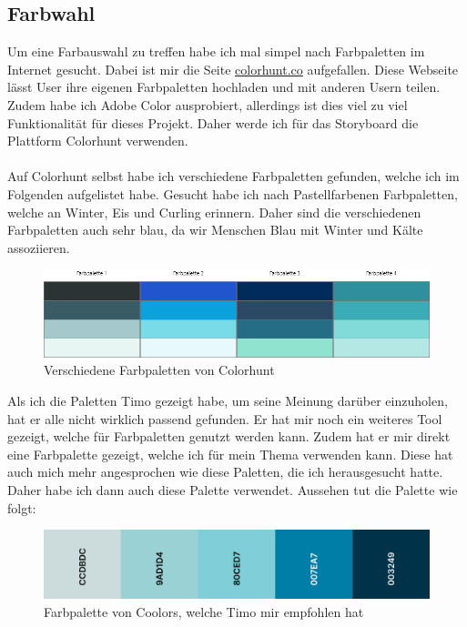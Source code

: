 \documentclass[11pt]{article}
\begin{document}
    \subsection{Farbwahl}
    Um eine Farbauswahl zu treffen habe ich mal simpel nach Farbpaletten im Internet gesucht. Dabei ist mir die Seite
    \url{colorhunt.co} aufgefallen. Diese Webseite lässt User ihre eigenen Farbpaletten hochladen und mit
    anderen Usern teilen. Zudem habe ich Adobe Color ausprobiert, allerdings ist dies viel zu viel
    Funktionalität für dieses Projekt. Daher werde ich für das Storyboard die Plattform Colorhunt verwenden.\\
    \\
    Auf Colorhunt selbst habe ich verschiedene Farbpaletten gefunden, welche ich im Folgenden aufgelistet
    habe. Gesucht habe ich nach Pastellfarbenen Farbpaletten, welche an Winter, Eis und Curling erinnern.
    Daher sind die verschiedenen Farbpaletten auch sehr blau, da wir Menschen Blau mit Winter und Kälte
    assoziieren.

    \begin{figure}[h]
        \includegraphics[width=\textwidth]{media/color_palettes}
        \caption{Verschiedene Farbpaletten von Colorhunt}
    \end{figure}
    \noindent
    Als ich die Paletten Timo gezeigt habe, um seine Meinung darüber einzuholen, hat er alle nicht wirklich passend
    gefunden. Er hat mir noch ein weiteres Tool gezeigt, welche für Farbpaletten genutzt werden kann. Zudem hat er
    mir direkt eine Farbpalette gezeigt, welche ich für mein Thema verwenden kann. Diese hat auch mich mehr
    angesprochen wie diese Paletten, die ich herausgesucht hatte. Daher habe ich dann auch diese Palette verwendet.
    Aussehen tut die Palette wie folgt:

    \begin{figure}[h]
        \includegraphics[width=\textwidth]{media/color_palette}
        \caption{Farbpalette von Coolors, welche Timo mir empfohlen hat}
    \end{figure}
\end{document}
